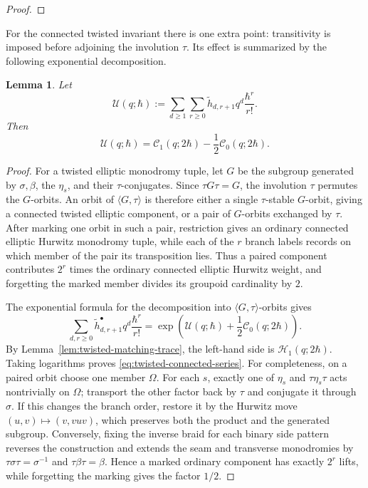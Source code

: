\documentclass[11pt,a4paper,reqno]{article}
\newtheorem{lemma}[theorem]{Lemma}
\theoremstyle{definition}
\theoremstyle{remark}
\begin{document}
\begin{proof}
\end{proof}

For the connected twisted invariant there is one extra point: transitivity is imposed before adjoining the involution $\tau$.  Its effect is summarized by the following exponential decomposition.

\begin{lemma}\label{lem:twisted-connected-series}
Let
\[
\mathscr U(q;\hbar):=\sum_{d\geq1}\sum_{r\geq0} \widetilde h_{d,r+1}q^d\frac{\hbar^r}{r!}.
\]
Then
\begin{equation}\label{eq:twisted-connected-series}
\mathscr U(q;\hbar) =\mathscr C_1(q;2\hbar)-\frac12\mathscr C_0(q;2\hbar).
\end{equation}
\end{lemma}

\begin{proof}
For a twisted elliptic monodromy tuple, let $G$ be the subgroup generated by $\sigma,\beta$, the $\eta_s$, and their $\tau$-conjugates.  Since $\tau G\tau=G$, the involution $\tau$ permutes the $G$-orbits.  An orbit of $\langle G,\tau\rangle$ is therefore either a single $\tau$-stable $G$-orbit, giving a connected twisted elliptic component, or a pair of $G$-orbits exchanged by $\tau$.  After marking one orbit in such a pair, restriction gives an ordinary connected elliptic Hurwitz monodromy tuple, while each of the $r$ branch labels records on which member of the pair its transposition lies.  Thus a paired component contributes $2^r$ times the ordinary connected elliptic Hurwitz weight, and forgetting the marked member divides its groupoid cardinality by $2$.

The exponential formula for the decomposition into $\langle G,\tau\rangle$-orbits gives
\[
\sum_{d,r\geq0}\widetilde h_{d,r+1}^{\bullet}q^d\frac{\hbar^r}{r!} =\exp\left(\mathscr U(q;\hbar)+\frac12\mathscr C_0(q;2\hbar)\right).
\]
By Lemma~\ref{lem:twisted-matching-trace}, the left-hand side is $\mathscr H_1(q;2\hbar)$.  Taking logarithms proves \eqref{eq:twisted-connected-series}.  For completeness, on a paired orbit choose one member $\Omega$.  For each $s$, exactly one of $\eta_s$ and $\tau\eta_s\tau$ acts nontrivially on $\Omega$; transport the other factor back by $\tau$ and conjugate it through $\sigma$.  If this changes the branch order, restore it by the Hurwitz move $(u,v)\mapsto(v,vuv)$, which preserves both the product and the generated subgroup.  Conversely, fixing the inverse braid for each binary side pattern reverses the construction and extends the seam and transverse monodromies by $\tau\sigma\tau=\sigma^{-1}$ and $\tau\beta\tau=\beta$.  Hence a marked ordinary component has exactly $2^r$ lifts, while forgetting the marking gives the factor $1/2$.
\end{proof}
\end{document}

